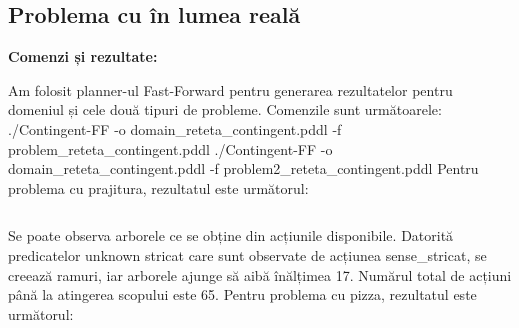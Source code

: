 \subsection{Problema cu în lumea reală}
 \textbf{Comenzi și rezultate:}

\newline
  Am folosit planner-ul Fast-Forward pentru generarea rezultatelor pentru domeniul și cele două tipuri de probleme. Comenzile sunt următoarele:
  \newline
    \newline
  ./Contingent-FF -o domain\_reteta\_contingent.pddl -f problem\_reteta\_contingent.pddl
    \newline
./Contingent-FF -o domain\_reteta\_contingent.pddl -f problem2\_reteta\_contingent.pddl
  \newline
    \newline
    Pentru problema cu prajitura, rezultatul este următorul:
    \newline
        \inputminted[linenos]{C}{cod/rez_problem_contingent.txt}   
        
    \newline 
    \newline
    Se poate observa arborele ce se obține din acțiunile disponibile. Datorită predicatelor unknown stricat care sunt observate de acțiunea sense\_stricat, se creează ramuri, iar arborele ajunge să aibă înălțimea 17. Numărul total de acțiuni până la atingerea scopului este 65.
    \newline
    \newline
    Pentru problema cu pizza, rezultatul este următorul:
    \newline
        \inputminted[linenos]{C}{cod/rez_problem2_contingent.txt}   
        
